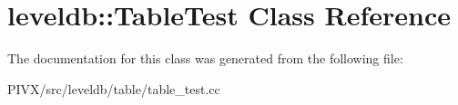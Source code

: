\hypertarget{classleveldb_1_1_table_test}{}\section{leveldb\+:\+:Table\+Test Class Reference}
\label{classleveldb_1_1_table_test}


The documentation for this class was generated from the following file\+:\begin{DoxyCompactItemize}
\item 
P\+I\+V\+X/src/leveldb/table/table\+\_\+test.\+cc\end{DoxyCompactItemize}
